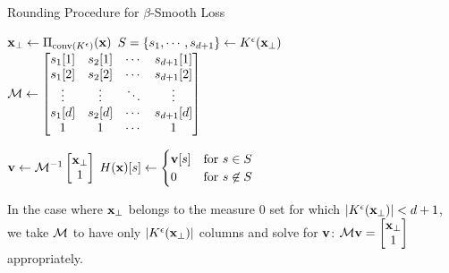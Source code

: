 \begin{algorithm}[H]
\caption{Rounding Procedure for $\beta$-Smooth Loss}
\label{alg:BH}
\KwIn{$\x \in \cK$}
\KwOut{$\Hex \in \Delta(\Ke)$}

$\mathbf{x}_\perp \gets \Pi_{\mathrm{conv}(K^{\epsilon})}(\mathbf{x})$ 
$S = \{s_1, \cdots, s_{d+1}\} \gets K^{\epsilon}(\mathbf{x}_\perp)$ 
$\mathcal{M} \gets \begin{bmatrix}
    s_1[1] & s_2[1] & \cdots & s_{d+1}[1] \\
    s_1[2] & s_2[2] & \cdots & s_{d+1}[2] \\
    \vdots  & \vdots  & \ddots & \vdots    \\
    s_1[d] & s_2[d] & \cdots & s_{d+1}[d] \\
    1       & 1       & \cdots & 1
\end{bmatrix}$

$\mathbf{v} \gets \mathcal{M}^{-1} \begin{bmatrix}
    \mathbf{x}_\perp\\
    1
\end{bmatrix}$ 
\Return $H(\mathbf{x})[s] \gets \begin{cases}
    \mathbf{v}[s] & \text{for } s \in S\\
    0 & \text{for } s \not\in S
\end{cases}$
\end{algorithm}
































In the case where $\mathbf{x}_\perp$ belongs to the measure $0$ set for which $\left|K^{\epsilon}(\mathbf{x}_\perp)\right| < d+1$, we take $\mathcal{M}$ to have only $\left|K^{\epsilon}(\mathbf{x}_\perp)\right|$ columns and solve for $\mathbf{v}$: $\mathcal{M}\mathbf{v} = \begin{bmatrix}
    \mathbf{x}_\perp\\
    1
\end{bmatrix}$ appropriately. 










